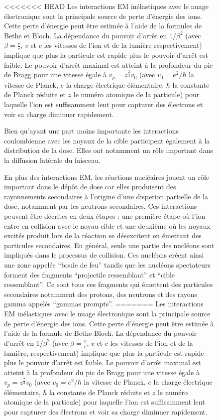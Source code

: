 \documentclass[11pt,a4paper,oldfontcommands]{memoir}
\begin{document}
\begin{figure}
<<<<<<< HEAD
Les interactions EM inélastiques avec le nuage électronique sont la principale source de perte d'énergie des ions.  Cette perte d'énergie peut être estimée à l'aide de la formules de Bethe et Bloch. La dépendance du pouvoir d'arrêt en $1/\beta^2$ (avec $\beta = \frac{v}{c}$, $v$ et $c$ les vitesses de l'ion et de la lumière respectivement) implique que plus la particule est rapide plus le pouvoir d'arrêt est faible. Le pouvoir d'arrêt maximal est atteint à la profondeur du pic de Bragg pour une vitesse égale à $v_p = z^{\frac{2}{3}}v_0$ (avec $v_0 = e^2/\hbar$ la vitesse de Planck, $e$ la charge électrique élémentaire, $\hbar$ la constante de Planck réduite et $z$ le numéro atomique de la particule) pour laquelle l'ion est suffisamment lent pour capturer des électrons et voir sa charge diminuer rapidement. 

Bien qu'ayant une part moins importante les interactions coulombienne avec les noyaux de la cible participent également à la distribution de la dose. Elles ont notamment un rôle important dans la diffusion latérale du faisceau.

En plus des interactions EM, les réactions nucléaires jouent un rôle important dans le dépôt de dose car elles produisent des rayonnements secondaires à l'origine d'une disperion partielle de la dose, notamment par les neutrons secondaires. Ces interactions peuvent être décrites en deux étapes : une première étape où l'ion entre en collision avec le noyau cible et une deuxième où les noyaux excités produit lors de la réaction se désexcitent en émettant des particules secondaires. En général, seule une partie des nucléons sont impliqués dans le processus de collision. Ces nucléons créent ainsi une zone appelée \enquote{boule de feu} tandis que les nucléons spectateurs forment des fragments \enquote{projectile ressemblant} et \enquote{cible ressemblant}. Ce sont tous ces fragments qui émettent des particules secondaires notamment des protons, des neutrons et des rayons gamma appelés \enquote{gammas prompts}.
=======
Les interactions EM inélastiques avec le nuage électronique sont la principale source de perte d'énergie des ions.  Cette perte d'énergie peut être estimée à l'aide de la formule de Bethe-Bloch. La dépendance du pouvoir d'arrêt en $1/\beta^2$ (avec $\beta = \frac{v}{c}$, $v$ et $c$ les vitesses de l'ion et de la lumière, respectivement) implique que plus la particule est rapide plus le pouvoir d'arrêt est faible. Le pouvoir d'arrêt maximal est atteint à la profondeur du pic de Bragg pour une vitesse égale à $v_p = z^{\frac{2}{3}}v_0$ (avec $v_0 = e^2/\hbar$ la vitesse de Planck, $e$ la charge électrique élémentaire, $\hbar$ la constante de Planck réduite et $z$ le numéro atomique de la particule) pour laquelle l'ion est suffisamment lent pour capturer des électrons et voir sa charge diminuer rapidement. 


\end{figure}
\end{document}
